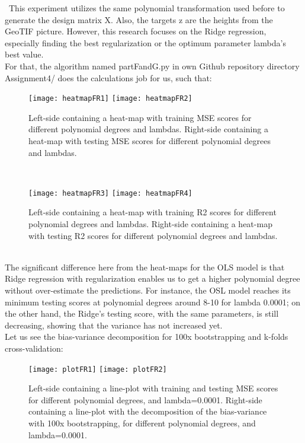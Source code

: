 \quad \, This experiment utilizes the same polynomial transformation used before to generate the design matrix X. Also, the targets z are the heights from the GeoTIF picture. However, this research focuses on the Ridge regression, especially finding the best regularization or the optimum parameter lambda's best value. \\

For that, the algorithm named partFandG.py in own Github repository directory Assignment4/ does the calculations job for us, such that: \\

\begin{figure}[H]
\label{fig:heatmapFR1and2}
\centering
\texttt{[image: heatmapFR1]}
\texttt{[image: heatmapFR2]}
\caption{Left-side containing a heat-map with training MSE scores for different polynomial degrees and lambdas. Right-side containing a heat-map with testing MSE scores for different polynomial degrees and lambdas.}
\end{figure}\\

\begin{figure}[H]
\label{fig:heatmapFR3and4}
\centering
\texttt{[image: heatmapFR3]}
\texttt{[image: heatmapFR4]}
\caption{Left-side containing a heat-map with training R2 scores for different polynomial degrees and lambdas. Right-side containing a heat-map with testing R2 scores for different polynomial degrees and lambdas.}
\end{figure}\\

The significant difference here from the heat-maps for the OLS model is that Ridge regression with regularization enables us to get a higher polynomial degree without over-estimate the predictions. For instance, the OSL model reaches its minimum testing scores at polynomial degrees around 8-10 for lambda 0.0001; on the other hand, the Ridge's testing score, with the same parameters, is still decreasing, showing that the variance has not increased yet. \\

Let us see the bias-variance decomposition for 100x bootstrapping and k-folds cross-validation: \\

\begin{figure}[H]
\label{fig:plotFR1and2}
\centering
\texttt{[image: plotFR1]}
\texttt{[image: plotFR2]}
\caption{Left-side containing a line-plot with training and testing MSE scores for different polynomial degrees, and lambda=0.0001. Right-side containing a line-plot with the decomposition of the bias-variance with 100x bootstrapping, for different polynomial degrees, and lambda=0.0001.}
\end{figure}\\

